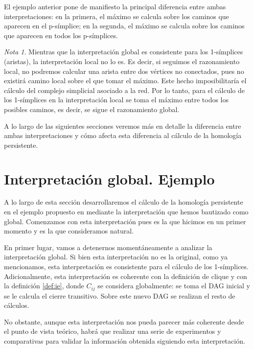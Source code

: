 \documentclass[12pt, a4paper, twoside]{book}
\numberwithin{equation}{section}
\theoremstyle{definition}
\theoremstyle{remark}
\newtheorem*{remark}{Nota}
\theoremstyle{plain}
\begin{document}
	El ejemplo anterior pone de manifiesto la principal diferencia 
	entre ambas interpretaciones: en la primera, el máximo se 
	calcula sobre los caminos que aparecen en el p-símplice; en la 
	segunda, el máximo se calcula sobre los caminos que aparecen 
	en todos los p-símplices.
	\begin{remark}
		Mientras que la interpretación global es consistente 
		para los 1-símplices (aristas), la interpretación 
		local no lo es. Es decir, si seguimos el razonamiento local, 
		no podremos calcular una arista entre dos vértices no 
		conectados, pues no existirá camino local sobre el que tomar 
		el máximo. Este hecho imposibilitaría el cálculo del complejo 
		simplicial asociado a la red. Por lo tanto, para el cálculo de 
		los 1-símplices en la interpretación local se toma el máximo 
		entre todos los posibles caminos, es decir, se sigue el 
		razonamiento global. 
	\end{remark}
	
	A lo largo de las siguientes secciones veremos más en detalle la 
	diferencia entre ambas interpretaciones y cómo afecta esta diferencia
	al cálculo de la homología persistente.

	\section{Interpretación global. Ejemplo}
	
	A lo largo de esta sección desarrollaremos el cálculo de la homología
	persistente en el ejemplo propuesto en \cite{Articulo-Watanabe} 
	mediante la interpretación que hemos bautizado como global. Comenzamos
	con esta interpretación pues es la que hicimos en un primer momento y 
	es la que consideramos natural.

	En primer lugar, vamos a detenernos momentáneamente a analizar la 
	interpretación global. Si bien esta interpretación no es la original, 
	como ya mencionamos, esta interpretación es consistente para el 
	cálculo de los 1-símplices. Adicionalmente, esta interpretación es 
	coherente con la definición de clique y con la definición 
	\ref{def:ie}, donde $C_{ij}$ se considera globalmente: se toma el DAG
	inicial y se le calcula el cierre transitivo. Sobre este nuevo DAG se
	realizan el resto de cálculos.

	No obstante, aunque esta interpretación nos pueda parecer más 
	coherente desde el punto de vista teórico, habrá que realizar una 
	serie de experimentos y comparativas para validar la información 
	obtenida siguiendo esta interpretación.
\end{document}

